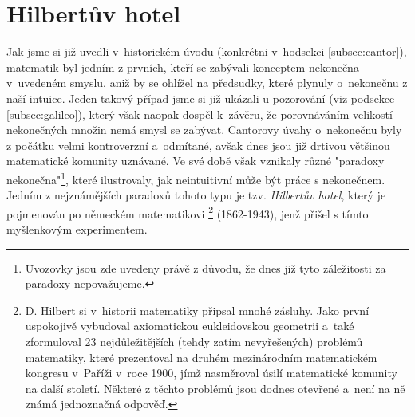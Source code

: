 \section{Hilbertův hotel}\label{sec:hilbertuv_hotel}
Jak jsme si již uvedli v~historickém úvodu (konkrétni v~hodsekci \ref{subsec:cantor}), matematik  byl jedním z prvních, kteří se zabývali konceptem nekonečna v~uvedeném smyslu, aniž by se ohlížel na předsudky, které plynuly o~nekonečnu z naší intuice. Jeden takový případ jsme si již ukázali u pozorování  (viz podsekce \ref{subsec:galileo}), který však naopak dospěl k~závěru, že porovnáváním velikostí nekonečných množin nemá smysl se zabývat. Cantorovy úvahy o~nekonečnu byly z počátku velmi kontroverzní a~odmítané, avšak dnes jsou již drtivou většinou matematické komunity uznávané. Ve své době však vznikaly různé "paradoxy nekonečna"\footnote{Uvozovky jsou zde uvedeny právě z důvodu, že dnes již tyto záležitosti za paradoxy nepovažujeme.}, které ilustrovaly, jak neintuitivní může být práce s nekonečnem. Jedním z nejznámějších paradoxů tohoto typu je tzv. \emph{Hilbertův hotel}, který je pojmenován po německém matematikovi \footnote{D. Hilbert si v~historii matematiky připsal mnohé zásluhy. Jako první uspokojivě vybudoval axiomatickou eukleidovskou geometrii a~také zformuloval 23 nejdůležitějších (tehdy zatím nevyřešených) problémů matematiky, které prezentoval na druhém mezinárodním matematickém kongresu v~Paříži v~roce 1900, jímž nasměroval úsilí matematické komunity na další století. Některé z těchto problémů jsou dodnes otevřené a~není na ně známá jednoznačná odpověď.} \mbox{(1862-1943)}, jenž přišel s tímto myšlenkovým experimentem.
\medskip

